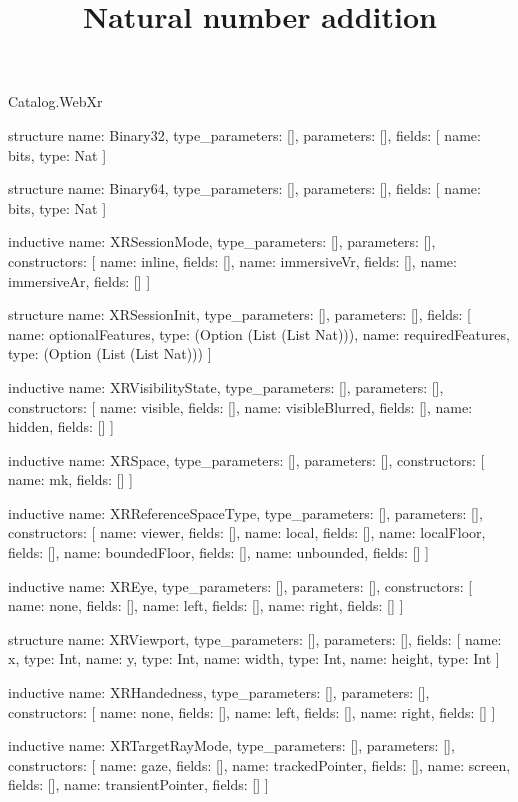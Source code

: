 \begin{lexlean}{Catalog.WebXr}
\title{Natural number addition}
\begin{semanticmodule}
structure{
  name: Binary32,
  type_parameters: [],
  parameters: [],
  fields: [
    {name: bits, type: Nat}
  ]
}

structure{
  name: Binary64,
  type_parameters: [],
  parameters: [],
  fields: [
    {name: bits, type: Nat}
  ]
}

inductive{
  name: XRSessionMode,
  type_parameters: [],
  parameters: [],
  constructors: [
    {name: inline, fields: []},
    {name: immersiveVr, fields: []},
    {name: immersiveAr, fields: []}
  ]
}

structure{
  name: XRSessionInit,
  type_parameters: [],
  parameters: [],
  fields: [
    {name: optionalFeatures, type: (Option (List (List Nat)))},
    {name: requiredFeatures, type: (Option (List (List Nat)))}
  ]
}

inductive{
  name: XRVisibilityState,
  type_parameters: [],
  parameters: [],
  constructors: [
    {name: visible, fields: []},
    {name: visibleBlurred, fields: []},
    {name: hidden, fields: []}
  ]
}

inductive{
  name: XRSpace,
  type_parameters: [],
  parameters: [],
  constructors: [
    {name: mk, fields: []}
  ]
}

inductive{
  name: XRReferenceSpaceType,
  type_parameters: [],
  parameters: [],
  constructors: [
    {name: viewer, fields: []},
    {name: local, fields: []},
    {name: localFloor, fields: []},
    {name: boundedFloor, fields: []},
    {name: unbounded, fields: []}
  ]
}

inductive{
  name: XREye,
  type_parameters: [],
  parameters: [],
  constructors: [
    {name: none, fields: []},
    {name: left, fields: []},
    {name: right, fields: []}
  ]
}

structure{
  name: XRViewport,
  type_parameters: [],
  parameters: [],
  fields: [
    {name: x, type: Int},
    {name: y, type: Int},
    {name: width, type: Int},
    {name: height, type: Int}
  ]
}

inductive{
  name: XRHandedness,
  type_parameters: [],
  parameters: [],
  constructors: [
    {name: none, fields: []},
    {name: left, fields: []},
    {name: right, fields: []}
  ]
}

inductive{
  name: XRTargetRayMode,
  type_parameters: [],
  parameters: [],
  constructors: [
    {name: gaze, fields: []},
    {name: trackedPointer, fields: []},
    {name: screen, fields: []},
    {name: transientPointer, fields: []}
  ]
}


\end{semanticmodule}
\end{lexlean}
